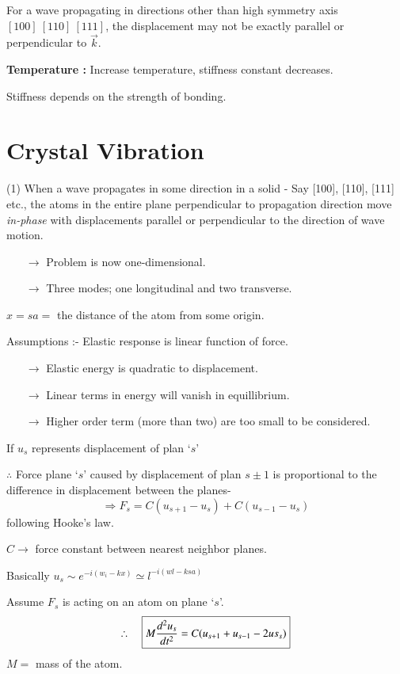 For a wave propagating in directions other than high symmetry axis $[100] \ [110] \ [111]$, the displacement may not be exactly parallel or perpendicular to $\overrightarrow{k}$.

\medskip
\noindent
{\bf Temperature :} Increase temperature, stiffness constant decreases.

Stiffness depends on the strength of bonding.

\section*{Crystal Vibration}

(1) When a wave propagates in some direction in a solid - Say [100], [110], [111] etc., the atoms in the entire plane perpendicular to propagation direction move {\em in-phase} with displacements parallel or perpendicular to the direction of wave motion.
\begin{itemize}
\item[$\to$] Problem is now one-dimensional.

\item[$\to$] Three modes; one longitudinal and two transverse.
\end{itemize}
$x=sa=$ the distance of the atom from some origin.

Assumptions :- Elastic response is linear function of force.
\begin{itemize}
\item[$\to$] Elastic energy is quadratic to displacement.

\item[$\to$] Linear terms in energy will vanish in equillibrium.

\item[$\to$] Higher order term (more than two) are too small to be considered.
\end{itemize}
If $u_{s}$ represents displacement of plan `$s$'

$\therefore$ Force plane `$s$' caused by displacement of plan $s\pm 1$ is proportional to the difference in displacement between the planes-
$$
\Rightarrow F_{s}=C(u_{s+1}-u_{s})+C(u_{s-1}-u_{s})
$$
following Hooke's law.

$C\to$ force constant between nearest neighbor planes.

Basically $u_{s}\sim e^{-i(w_{i}-kx)}\simeq l^{-i(wl-ksa)}$

Assume $F_{s}$ is acting on an atom on plane `$s$'.
$$
\therefore\quad \fbox{$M\dfrac{d^{2}u_{s}}{dt^{2}}=C(u_{s+1}+u_{s-1}-2us_{s})$}
$$
$M=$ mass of the atom.

